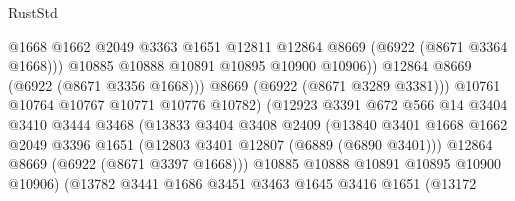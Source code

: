 \begin{lexlean}{RustStd}
\begin{coremodule}
                                      @1668
                                      @1662
                                      @2049
                                      @3363
                                      @1651
                                      @12811
                                      @12864
                                      @8669
                                      (@6922 (@8671 @3364 @1668)))
                                    @10885
                                    @10888
                                    @10891
                                    @10895
                                    @10900
                                    @10906))
                                @12864
                                @8669
                                (@6922 (@8671 @3356 @1668)))
                              @8669
                              (@6922 (@8671 @3289 @3381)))
                            @10761
                            @10764
                            @10767
                            @10771
                            @10776
                            @10782)
                          (@12923
                            @3391
                            @672
                            @566
                            @14
                            @3404
                            @3410
                            @3444
                            @3468
                            (@13833
                              @3404
                              @3408
                              @2409
                              (@13840
                                @3401
                                @1668
                                @1662
                                @2049
                                @3396
                                @1651
                                (@12803 @3401 @12807 (@6889 (@6890 @3401)))
                                @12864
                                @8669
                                (@6922 (@8671 @3397 @1668)))
                              @10885
                              @10888
                              @10891
                              @10895
                              @10900
                              @10906)
                            (@13782
                              @3441
                              @1686
                              @3451
                              @3463
                              @1645
                              @3416
                              @1651
                              (@13172

\end{coremodule}
\end{lexlean}
